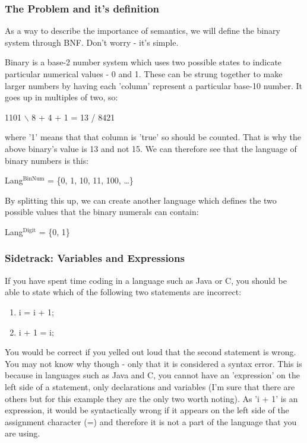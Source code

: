 \documentclass[12pt]{article}
\begin{document}
\subsubsection{The Problem and it's definition}
\label{sec-2-3-1}
As a way to describe the importance of semantics, we will define the binary
system through BNF.  Don't worry - it's simple.

Binary is a base-2 number system which uses two possible states to indicate
particular numerical values - 0 and 1.  These can be strung together to make
larger numbers by having each 'column' represent a particular base-10 number.
It goes up in multiples of two, so:

1101
    $\backslash$
     8 + 4 + 1 = 13
    /
8421

where '1' means that that column is 'true' so should be counted.  That is why
the above binary's value is 13 and not 15.  We can therefore see  that the
language of binary numbers is this:

Lang$^{\text{BinNum}}$ = \{0, 1, 10, 11, 100, \ldots{}\}

By splitting this up, we can create another language which defines the two
possible values that the binary numerals can contain:

Lang$^{\text{Digit}}$ = \{0, 1\}

\subsubsection{Sidetrack: Variables and Expressions}
\label{sec-2-3-2}
If you have spent time coding in a language such as Java or C, you should be
able to state which of the following two statements are incorrect:

\begin{enumerate}
\item i = i + 1;
\item i + 1 = i;
\end{enumerate}

You would be correct if you yelled out loud that the second statement is wrong.
You may not know why though - only that it is considered a syntax error.  This
is because in languages such as Java and C, you cannot have an 'expression' on
the left side of a statement, only declarations and variables (I'm sure that
there are others but for this example they are the only two worth noting).  As
'i + 1' is an expression, it would be syntactically wrong if it appears on the
left side of the assignment character (=) and therefore it is not a part of the
language that you are using.
\end{document}
